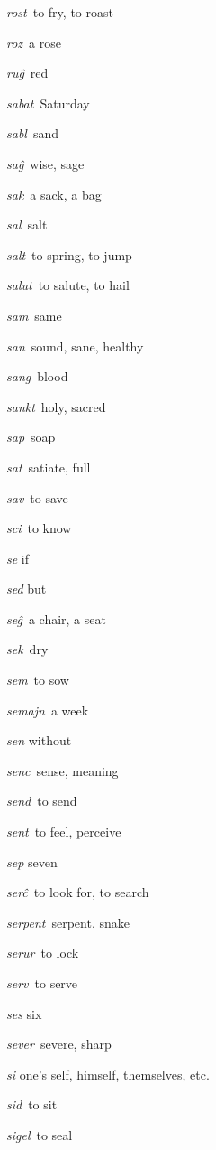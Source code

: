\begin{landscape}
\begin{multicols}{5}
\begin{outdent}{1em}
\emph{rost\,} to fry, to roast

\emph{roz\,} a rose

\emph{ruĝ\,} red
\end{outdent}


\begin{outdent}{1em}
\emph{sabat\,} Saturday

\emph{sabl\,} sand

\emph{saĝ\,} wise, sage

\emph{sak\,} a sack, a bag

\emph{sal\,} salt

\emph{salt\,} to spring, to jump

\emph{salut\,} to salute, to hail 

\emph{sam\,} same

\emph{san\,} sound, sane, healthy

\emph{sang\,} blood

\emph{sankt\,} holy, sacred

\emph{sap\,} soap

\emph{sat\,} satiate, full

\emph{sav\,} to save

\emph{sci\,} to know

\emph{se} if

\emph{sed} but

\emph{seĝ\,} a chair, a seat

\emph{sek\,} dry

\emph{sem\,} to sow

\emph{semajn\,} a week

\emph{sen} without

\emph{senc\,} sense, meaning

\emph{send\,} to send

\emph{sent\,} to feel, perceive

\emph{sep} seven

\emph{serĉ\,} to look for, to search

\emph{serpent\,} serpent, snake

\emph{serur\,} to lock

\emph{serv\,} to serve

\emph{ses} six

\emph{sever\,} severe, sharp

\emph{si} one’s self, himself, themselves, etc.

\emph{sid\,} to sit

\emph{sigel\,} to seal


\end{outdent}
\end{multicols}
\end{landscape}
